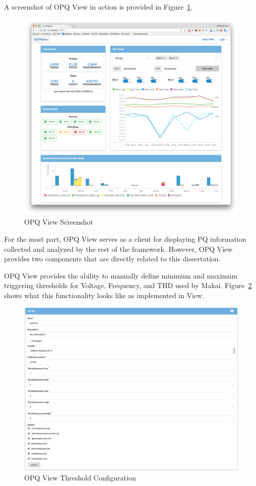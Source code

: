 A screenshot of OPQ View in action is provided in Figure~\ref{fig:opq-view}.

\begin{figure}
	\centering
	\includegraphics[width=1\linewidth]{figures/opqview-landing-page.png}
	\caption{OPQ View Screenshot}\label{fig:opq-view}
\end{figure}

For the most part, OPQ View serves as a client for displaying PQ information collected and analyzed by the rest of the framework. However, OPQ View provides two components that are directly related to this dissertation.

OPQ View provides the ability to manually define minimum and maximum triggering thresholds for Voltage, Frequency, and THD used by Makai. Figure~\ref{fig:view_thresholds} shows what this functionality looks like as implemented in View.

\begin{figure}
	\centering
	\includegraphics[width=1\linewidth]{figures/view_thresholds.png}
	\caption{OPQ View Threshold Configuration}\label{fig:view_thresholds}
\end{figure}

